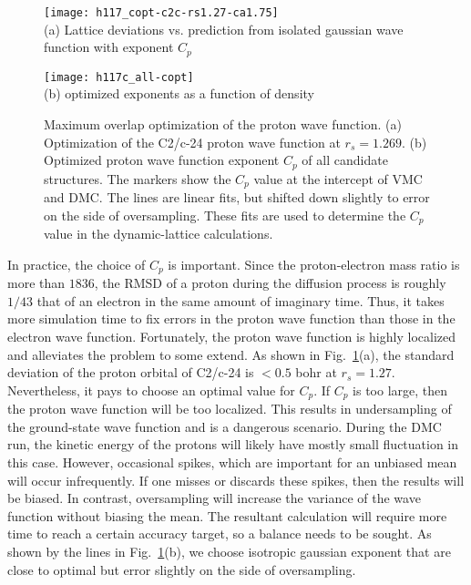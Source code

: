 \begin{figure}[h]
\centering
\begin{minipage}{0.49\textwidth}
\centering
\texttt{[image: h117\_copt-c2c-rs1.27-ca1.75]}\\
(a) Lattice deviations vs. prediction from isolated gaussian wave function with exponent $C_p$
\end{minipage}
\begin{minipage}{0.49\textwidth}
\centering
\texttt{[image: h117c\_all-copt]}\\
(b) optimized exponents as a function of density
\end{minipage}
\caption{Maximum overlap optimization of the proton wave function. (a) Optimization of the C2/c-24 proton wave function at $r_s=1.269$. (b) Optimized proton wave function exponent $C_p$ of all candidate structures. The markers show the $C_p$ value at the intercept of VMC and DMC. The lines are linear fits, but shifted down slightly to error on the side of oversampling. These fits are used to determine the $C_p$ value in the dynamic-lattice calculations.}
\label{fig:hsolid-cp-opt}
\end{figure}

In practice, the choice of $C_p$ is important.
Since the proton-electron mass ratio is more than $1836$, the RMSD of a proton during the diffusion process is roughly $1/43$ that of an electron in the same amount of imaginary time.
Thus, it takes more simulation time to fix errors in the proton wave function than those in the electron wave function.
Fortunately, the proton wave function is highly localized and alleviates the problem to some extend.
As shown in Fig.~\ref{fig:hsolid-cp-opt}(a), the standard deviation of the proton orbital of C2/c-24 is $<0.5$ bohr at $r_s=1.27$.
Nevertheless, it pays to choose an optimal value for $C_p$.
If $C_p$ is too large, then the proton wave function will be too localized.
This results in undersampling of the ground-state wave function and is a dangerous scenario.
During the DMC run, the kinetic energy of the protons will likely have mostly small fluctuation in this case.
However, occasional spikes, which are important for an unbiased mean will occur infrequently.
If one misses or discards these spikes, then the results will be biased.
In contrast, oversampling will increase the variance of the wave function without biasing the mean.
The resultant calculation will require more time to reach a certain accuracy target, so a balance needs to be sought.
As shown by the lines in Fig.~\ref{fig:hsolid-cp-opt}(b), we choose isotropic gaussian exponent that are close to optimal but error slightly on the side of oversampling.

